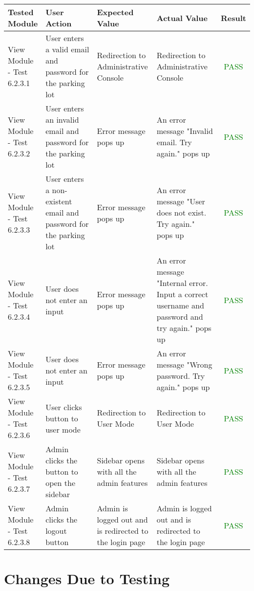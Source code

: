 \documentclass[12pt, titlepage]{article}
\begin{document}
\begin{center}
\newpage
\begin{center}
\begin{tabular}{|p{0.15\linewidth}|p{0.30\linewidth}|p{0.25\linewidth}|p{0.30\linewidth}|c|} 
\hline
\textbf{Tested Module} & \textbf{User Action} & \textbf{Expected Value} &
\textbf{Actual Value} & \textbf{Result} \\
\hline
View Module - Test 6.2.3.1 & User enters a valid email and password for the
parking lot & Redirection to Administrative Console & Redirection to
Administrative Console & \textcolor{Green}{PASS} \\
\hline
View Module - Test 6.2.3.2 & User enters an invalid email and password for the
parking lot & Error message pops up & An error message "Invalid email. Try
again." pops up & \textcolor{Green}{PASS} \\
\hline
View Module - Test 6.2.3.3 & User enters a non-existent email and password for
the parking lot & Error message pops up & An error message "User does not exist.
Try again." pops up & \textcolor{Green}{PASS} \\
\hline
View Module - Test 6.2.3.4 & User does not enter an input & Error message pops
up & An error message "Internal error. Input a correct username and password and
try again." pops up & \textcolor{Green}{PASS} \\
\hline
View Module - Test 6.2.3.5 & User does not enter an input & Error message pops
up & An error message "Wrong password. Try again." pops up &
\textcolor{Green}{PASS} \\
\hline
View Module - Test 6.2.3.6 & User clicks button to user mode & Redirection to
User Mode & Redirection to User Mode & \textcolor{Green}{PASS} \\
\hline
View Module - Test 6.2.3.7 & Admin clicks the button to open the sidebar &
Sidebar opens with all the admin features & Sidebar opens with all the admin
features & \textcolor{Green}{PASS} \\
\hline
View Module - Test 6.2.3.8 & Admin clicks the logout button & Admin is logged
out and is redirected to the login page & Admin is logged out and is redirected
to the login page & \textcolor{Green}{PASS} \\
\hline
\end{tabular}
\end{center}
\end{center}

\color{black}
\newpage
\section{Changes Due to Testing}
\label{sec:changes}
\color{red}{All of the these changes were made due to user validation testing, where one of our group members had their parent use our product for surveying their parking lot. A wide variety of changes were implemented in Revision 1, but in future revisions, we will tackle NFR-PE4-T1 and NFR-SR11-T1.}
\end{document}
